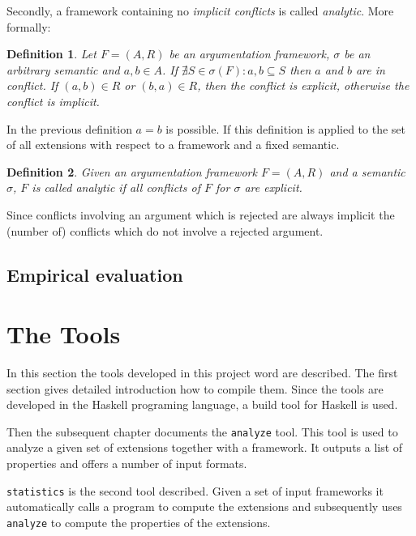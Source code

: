 \documentclass{scrartcl}
\newtheorem{definition}{Definition}
\begin{document}
Secondly, a framework containing no \emph{implicit conflicts} is called
\emph{analytic}.   More formally:

\begin{definition}
  Let $F=(A,R)$ be an argumentation framework, $\sigma$ be an arbitrary semantic
  and $a, b\in A$. If $\nexists S \in \sigma(F): {a,b} \subseteq S$ then $a$ and
  $b$ are in \emph{conflict}. If $(a, b) \in R$ or $(b, a)\in R$, then the
  conflict is \emph{explicit}, otherwise the conflict is \emph{implicit}.
\end{definition}

In the previous definition $a = b$ is possible. If this definition is applied to
the set of all extensions with respect to a framework and a fixed semantic.

\begin{definition}
Given an argumentation framework $F=(A,R)$ and a semantic $\sigma$, $F$ is
called \emph{analytic} if all conflicts of $F$ for $\sigma$ are explicit.
\end{definition}

Since conflicts involving an argument which is rejected are always implicit the
(number of) conflicts which do not involve a rejected argument.

\subsection{Empirical evaluation}

\section{The Tools}
\label{tools}
In this section the tools developed in this project word are described. The
first section gives detailed introduction how to compile them. Since the tools
are developed in the Haskell programing language, a build tool for Haskell is
used.

Then the subsequent chapter documents the \texttt{analyze} tool. This tool is
used to analyze a given set of extensions together with a framework. It outputs
a list of properties and offers a number of input formats.

\texttt{statistics} is the second tool described. Given a set of input
frameworks it automatically calls a program to compute the extensions and
subsequently uses \texttt{analyze} to compute the properties of the extensions.
\end{document}
